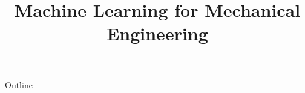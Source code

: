\documentclass[xcolor=dvipsnames,compress,t,pdf,notes]{beamer}
\title[\insertframenumber /\inserttotalframenumber]{Machine Learning for Mechanical Engineering}
\begin{document}
	\begin{frame}
	\titlepage
	\end{frame}
	
	\begin{frame}{Outline}
	    \tableofcontents
	\end{frame}

	
	
	
	
\end{document}
